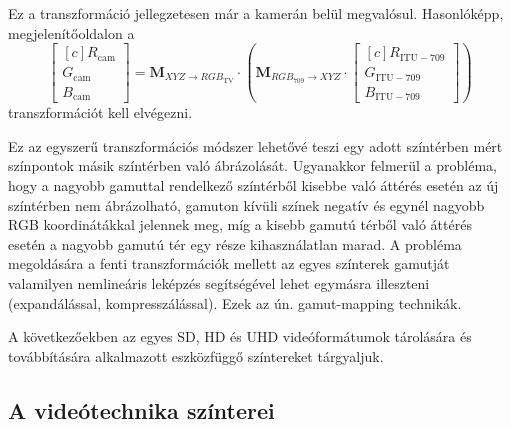 Ez a transzformáció jellegzetesen már a kamerán belül megvalósul.
%
Hasonlóképp, megjelenítőoldalon a
\begin{equation} 
\begin{bmatrix}[c]
       R_{\mathrm{cam}} \\[0.3em]
       G_{\mathrm{cam}} \\[0.3em]
       B_{\mathrm{cam}} \end{bmatrix}
       =
       \mathbf{M}_{ X\!Y\!Z \rightarrow R\!G\!B_{\mathrm{TV}} } \cdot 
\left(     \mathbf{M}_{R\!G\!B_{709}  \rightarrow X\!Y\!Z } \cdot
\begin{bmatrix}[c]
       R_{\mathrm{ITU}-709} \\[0.3em]
       G_{\mathrm{ITU}-709} \\[0.3em]
       B_{\mathrm{ITU}-709} \end{bmatrix}
 \right)
\end{equation}
transzformációt kell elvégezni.

Ez az egyszerű transzformációs módszer lehetővé teszi egy adott színtérben mért színpontok másik színtérben való ábrázolását.
Ugyanakkor felmerül a probléma, hogy a nagyobb gamuttal rendelkező színtérből kisebbe való áttérés esetén az új színtérben nem ábrázolható, gamuton kívüli színek negatív és egynél nagyobb RGB koordinátákkal jelennek meg, míg a kisebb gamutú térből való áttérés esetén a nagyobb gamutú tér egy része kihasználatlan marad.
A probléma megoldására a fenti transzformációk mellett az egyes színterek gamutját valamilyen nemlineáris leképzés segítségével lehet egymásra illeszteni (expandálással, kompresszálással).
Ezek az ún. gamut-mapping technikák.

A következőekben az egyes SD, HD és UHD videóformátumok tárolására és továbbítására alkalmazott eszközfüggő színtereket tárgyaljuk.

\subsection{A videótechnika színterei}

